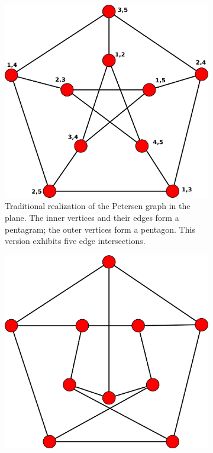 \documentclass[12pt,            %
               a4paper,         %
               oneside,         %
               DIV12,           %
               fleqn,           %
               halfparskip,     %
               nochapterprefix, %
               bibtotocnumbered,%
              ]{scrartcl} %
\theoremstyle{definition}
\begin{document}
\begin{figure}[p]
  \begin{subfigure}[t]{.45\textwidth}
    \centering
    \includegraphics[keepaspectratio=true,width=\textwidth]{../planar-graphs/petersen-grundlage.pdf}
    \caption{Traditional realization of the Petersen graph in the plane.
      The inner vertices and their edges form a pentagram; the outer
      vertices form a pentagon. This version exhibits five edge
      intersections.}
    \label{fig:petersen}
  \end{subfigure}\hfill
  \begin{subfigure}[t]{.45\textwidth}
    \centering
    \includegraphics[keepaspectratio=true,width=\textwidth]{../planar-graphs/petersen-zweikreuzungen.pdf}

\end{subfigure}
\end{figure}
\end{document}

